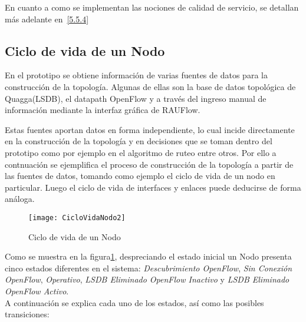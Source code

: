 En cuanto a como se implementan las nociones de calidad de servicio, se detallan m\'as adelante en~\ref{5.5.4} 

\subsection{Ciclo de vida de un Nodo}

En el prototipo se obtiene informaci\'on de varias fuentes de datos para la construcci\'on de la topolog\'ia. Algunas de ellas son la base de datos topol\'ogica de Quagga(LSDB), el datapath OpenFlow y a través del ingreso manual de informaci\'on mediante la interfaz gr\'afica de RAUFlow.

Estas fuentes aportan datos en forma independiente, lo cual incide directamente en la construcci\'on de la topolog\'ia y en decisiones que se toman dentro del prototipo como por ejemplo en el algoritmo de ruteo entre otros. Por ello a contnuaci\'on se ejemplifica el proceso de construcci\'on de la topolog\'ia a partir de las fuentes de datos, tomando como ejemplo el ciclo de vida de un nodo en particular. Luego el ciclo de vida de interfaces y enlaces puede deducirse de forma análoga.\\

\begin{figure}[ht!] 
\centering    
\texttt{[image: CicloVidaNodo2]}
\caption[Ciclo de vida de un Nodo]{Ciclo de vida de un Nodo}
\label{fig:CicloVidaNodo}
\end{figure}
  
Como se muestra en la figura\ref{fig:CicloVidaNodo}, despreciando el estado inicial un Nodo presenta cinco estados diferentes en el sistema: \textit{Descubrimiento OpenFlow}, \textit{Sin Conexión OpenFlow}, \textit{Operativo}, \textit{LSDB Eliminado OpenFlow Inactivo} y \textit{LSDB Eliminado OpenFlow Activo}.\\

A continuación se explica cada uno de los estados, así como las posibles transiciones:

